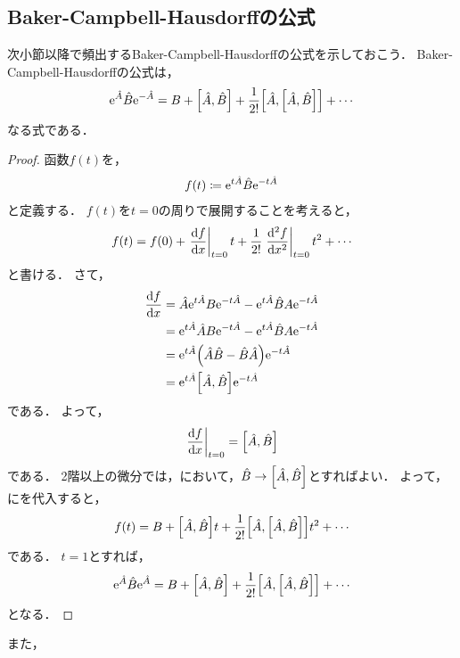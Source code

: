 \documentclass{report}
\begin{document}
  \subsection{Baker-Campbell-Hausdorffの公式}
    次小節以降で頻出するBaker-Campbell-Hausdorffの公式を示しておこう．
    Baker-Campbell-Hausdorffの公式は，
    \begin{align}
      \mathrm{e}^{\hat{A}}\hat{B}\mathrm{e}^{-\hat{A}} = B + \qty[\hat{A}, \hat{B}] + \frac{1}{2!}\qty[\hat{A}, \qty[\hat{A}, \hat{B}]] + \cdots
    \end{align}
    なる式である．
    \begin{proof}
      函数$f(t)$を，
      \begin{align}
        f(t) \coloneqq \mathrm{e}^{t\hat{A}}\hat{B}\mathrm{e}^{-t\hat{A}}
      \end{align}
      と定義する．
      $f(t)$を$t = 0$の周りで展開することを考えると，
      \begin{align}
        f(t) = f(0) + \eval{\dv{f}{x}}_{t = 0}t + \frac{1}{2!}\eval{\dv[2]{f}{x}}_{t = 0} t^2 + \cdots\label{taylor-bch}
      \end{align}
      と書ける．
      さて，
      \begin{align}
        \dv{f}{x} &= \hat{A}\mathrm{e}^{t\hat{A}}B\mathrm{e}^{-t\hat{A}} - \mathrm{e}^{t\hat{A}}\hat{B}A\mathrm{e}^{-t\hat{A}} \\ 
        &= \mathrm{e}^{t\hat{A}}\hat{A}B\mathrm{e}^{-t\hat{A}} - \mathrm{e}^{t\hat{A}}\hat{B}A\mathrm{e}^{-t\hat{A}} \\ 
        &= \mathrm{e}^{t\hat{A}}\qty(\hat{A}\hat{B} - \hat{B}\hat{A})\mathrm{e}^{-t\hat{A}} \\ 
        &= \mathrm{e}^{t\hat{A}}\qty[\hat{A}, \hat{B}]\mathrm{e}^{-t\hat{A}}\label{1st-diff-bch}
      \end{align}
      である．
      よって，
      \begin{align}
        \eval{\dv{f}{x}}_{t = 0} = \qty[\hat{A}, \hat{B}]
      \end{align}
      である．
      2階以上の微分では，において，$\hat{B} \to \qty[\hat{A}, \hat{B}]$とすればよい．
      よって，にを代入すると，
      \begin{align}
        f(t) = B + \qty[\hat{A}, \hat{B}]t + \frac{1}{2!}\qty[\hat{A}, \qty[\hat{A}, \hat{B}]]t^2 + \cdots
      \end{align}
      である．
      $t = 1$とすれば，
      \begin{align}
        \mathrm{e}^{\hat{A}}\hat{B}\mathrm{e}^{\hat{A}} = B + \qty[\hat{A}, \hat{B}] + \frac{1}{2!}\qty[\hat{A}, \qty[\hat{A}, \hat{B}]] + \cdots
      \end{align}
      となる．
    \end{proof}
    また，
      
\end{document}
